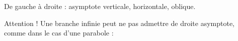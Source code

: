 \documentclass[class=report,crop=false]{standalone}
\begin{document}
%
%
%

De gauche à droite : asymptote verticale, horizontale, oblique.

Attention ! Une branche infinie peut ne pas admettre de droite asymptote, comme dans le cas d'une parabole :
\end{document}
